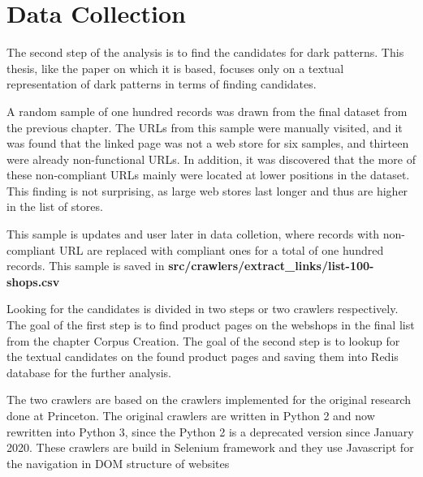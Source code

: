 \chapter{Data Collection}

The second step of the analysis is to find the candidates for dark patterns. This thesis, like the paper on which it is based\cite{dark-patterns-at-scale}, focuses only on a textual representation of dark patterns in terms of finding candidates.

A random sample of one hundred records was drawn from the final dataset from the previous chapter. The URLs from this sample were manually visited, and it was found that the linked page was not a web store for six samples, and thirteen were already non-functional URLs. In addition, it was discovered that the more of these non-compliant URLs mainly were located at lower positions in the dataset. This finding is not surprising, as large web stores last longer and thus are higher in the list of stores.

This sample is updates and user later in data colletion, where records with non-compliant URL are replaced with compliant ones for a total of one hundred records. This sample is saved in \textbf{src/crawlers/extract\_links/list-100-shops.csv}

Looking for the candidates is divided in two steps or two crawlers respectively. The goal of the first step is to find product pages on the webshops in the final list from the chapter Corpus Creation. The goal of the second step is to lookup for the textual candidates on the found product pages and saving them into Redis database for the further analysis.

The two crawlers are based on the crawlers implemented for the original research done at Princeton\cite{dark-patterns-at-scale}. The original crawlers are written in Python 2 and now rewritten into Python 3, since the Python 2 is a deprecated version since January 2020. These crawlers are build in Selenium framework and they use Javascript for the navigation in DOM structure of websites










